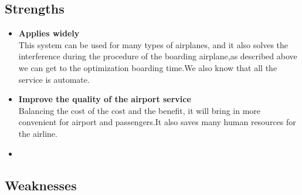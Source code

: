 \documentclass{mcmthesis}
\begin{document}
\subsection{Strengths}
\begin{itemize}
\item \textbf{Applies widely}\\
This  system can be used for many types of airplanes, and it also
solves the interference during  the procedure of the boarding
airplane,as described above we can get to the  optimization
boarding time.We also know that all the service is automate.
\item \textbf{Improve the quality of the airport service}\\
Balancing the cost of the cost and the benefit, it will bring in
more convenient  for airport and passengers.It also saves many
human resources for the airline. \item \textbf{}
\end{itemize}

\subsection{Weaknesses}


\begin{center}
\end{center}

\newpage
\memodate{\today}
\begin{memo}[Memorandum]
  \lipsum[1-3]
\end{memo}
\end{document}
